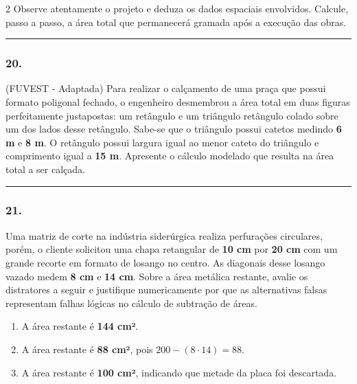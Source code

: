 \documentclass[twoside, 10pt, a4paper]{article}
\newlength{\espacoPreQuestao}\setlength{\espacoPreQuestao}{0.1cm}
\newlength{\espacoQuestao}\setlength{\espacoQuestao}{0.2cm}
\newlength{\espacoAlt}\setlength{\espacoAlt}{0.2cm}
\begin{document}
\begin{multicols*}{2}
Observe atentamente o projeto e deduza os dados espaciais envolvidos. Calcule, passo a passo, a área total que permanecerá gramada após a execução das obras.
\par\vspace{\espacoQuestao}

\noindent\textcolor{CorLinha}{\rule{\linewidth}{0.5pt}} 
\par\vspace{\espacoPreQuestao}
\subsubsection*{20.} (FUVEST - Adaptada) Para realizar o calçamento de uma praça que possui formato poligonal fechado, o engenheiro desmembrou a área total em duas figuras perfeitamente justapostas: um retângulo e um triângulo retângulo colado sobre um dos lados desse retângulo. Sabe-se que o triângulo possui catetos medindo \textbf{6 m} e \textbf{8 m}. O retângulo possui largura igual ao menor cateto do triângulo e comprimento igual a \textbf{15 m}. Apresente o cálculo modelado que resulta na área total a ser calçada.
\par\vspace{\espacoQuestao}

\noindent\textcolor{CorLinha}{\rule{\linewidth}{0.5pt}} 
\par\vspace{\espacoPreQuestao}
\subsubsection*{21.} Uma matriz de corte na indústria siderúrgica realiza perfurações circulares, porém, o cliente solicitou uma chapa retangular de \textbf{10 cm} por \textbf{20 cm} com um grande recorte em formato de losango no centro. As diagonais desse losango vazado medem \textbf{8 cm} e \textbf{14 cm}. Sobre a área metálica restante, avalie os distratores a seguir e justifique numericamente por que as alternativas falsas representam falhas lógicas no cálculo de subtração de áreas.

\begin{enumerate}[label=\alph*), itemsep=\espacoAlt]
\item A área restante é \textbf{144 cm²}.
\item A área restante é \textbf{88 cm²}, pois $ 200 - (8 \cdot 14) = 88 $.
\item A área restante é \textbf{100 cm²}, indicando que metade da placa foi descartada.
\end{enumerate}
\par\vspace{\espacoQuestao}


\end{multicols*}
\end{document}

